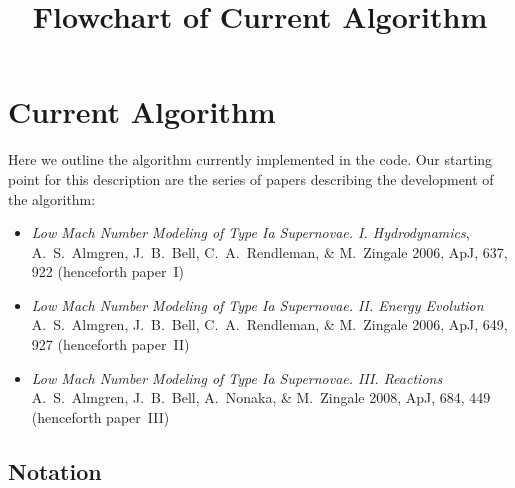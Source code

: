 \documentclass[11pt]{article}
\title{Flowchart of Current Algorithm}
\begin{document}
\maketitle
\tableofcontents
\cleardoublepage


\section{Current Algorithm}

Here we outline the algorithm currently implemented in the code.  Our
starting point for this description are the series of papers describing
the development of the algorithm:
\begin{itemize}
\item {\em Low Mach Number Modeling of Type Ia
  Supernovae. I. Hydrodynamics}, A.~S.~Almgren, J.~B.~Bell, 
  C.~A.~Rendleman, \& M.~Zingale 2006, ApJ, 637, 922 (henceforth
  paper~I)
\item {\em Low Mach Number Modeling of Type Ia Supernovae. II. Energy
  Evolution} A.~S.~Almgren, J.~B.~Bell, C.~A.~Rendleman, \& M.~Zingale
  2006, ApJ, 649, 927 (henceforth paper~II)
\item {\em Low Mach Number Modeling of Type Ia Supernovae. III. Reactions}
A.~S.~Almgren, J.~B.~Bell, A.~Nonaka, \& M.~Zingale
  2008, ApJ, 684, 449 (henceforth paper~III)
\end{itemize}


\subsection{Notation}
\end{document}
